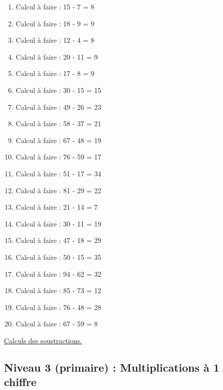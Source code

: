 \documentclass[11pt]{article}
\begin{document}
\begin{enumerate}
\item Calcul à faire :  15 - 7 = 8
\item Calcul à faire :  18 - 9 = 9
\item Calcul à faire :  12 - 4 = 8
\item Calcul à faire :  20 - 11 = 9
\item Calcul à faire :  17 - 8 = 9
\item Calcul à faire :  30 - 15 = 15
\item Calcul à faire :  49 - 26 = 23
\item Calcul à faire :  58 - 37 = 21
\item Calcul à faire :  67 - 48 = 19
\item Calcul à faire :  76 - 59 = 17
\item Calcul à faire :  51 - 17 = 34
\item Calcul à faire :  81 - 29 = 22
\item Calcul à faire :  21 - 14 = 7
\item Calcul à faire :  30 - 11 = 19
\item Calcul à faire :  47 - 18 = 29
\item Calcul à faire :  50 - 15 = 35
\item Calcul à faire :  94 - 62 = 32
\item Calcul à faire :  85 - 73 = 12
\item Calcul à faire :  76 - 48 = 28
\item Calcul à faire :  67 - 59 = 8
\end{enumerate}




\hyperref[orgeead96c]{Calculs des soustractions.}



\newpage


\subsection{Niveau 3 (primaire) : Multiplications à 1 chiffre}
\label{sec:org7072ce6}
\label{orgaa6a0ba}
\end{document}
